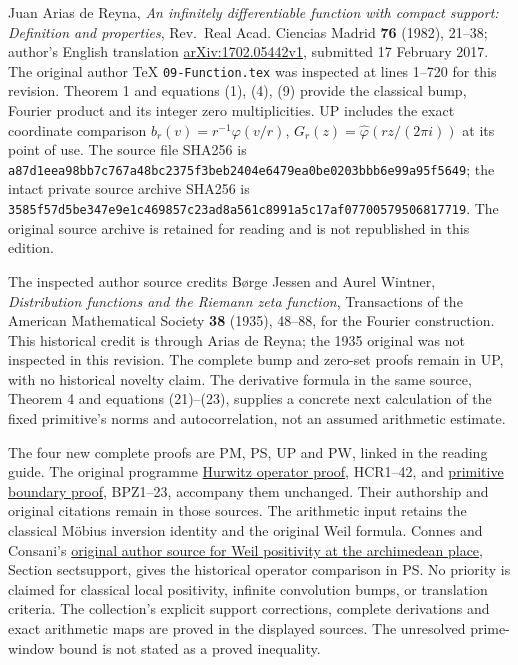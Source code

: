 \documentclass[
  10pt,
  a4paper,
]{article}
\begin{document}
Juan Arias de Reyna, \emph{An infinitely differentiable function with
compact support: Definition and properties}, Rev.~Real Acad. Ciencias
Madrid \textbf{76} (1982), 21--38; author's English translation
\href{https://arxiv.org/abs/1702.05442v1}{arXiv:1702.05442v1}, submitted
17 February 2017. The original author TeX \texttt{09-\allowbreak{}Function.\allowbreak{}tex} was
inspected at lines 1--720 for this revision. Theorem 1 and equations
(1), (4), (9) provide the classical bump, Fourier product and its
integer zero multiplicities. UP includes the exact coordinate comparison
\(b_r(v)=r^{-1}\varphi(v/r)\), \(G_r(z)=\widehat\varphi(rz/(2\pi i))\)
at its point of use. The source file SHA256 is
\texttt{a87d1eea\allowbreak{}98bb7c76\allowbreak{}7a48bc23\allowbreak{}75f3beb2\allowbreak{}404e6479\allowbreak{}ea0be020\allowbreak{}3bbb6e99\allowbreak{}a95f5649};
the intact private source archive SHA256 is
\texttt{3585f57d\allowbreak{}5be347e9\allowbreak{}e1c46985\allowbreak{}7c23ad8a\allowbreak{}561c8991\allowbreak{}a5c17af0\allowbreak{}77005795\allowbreak{}06817719}.
The original source archive is retained for reading and is not
republished in this edition.

The inspected author source credits Børge Jessen and Aurel Wintner,
\emph{Distribution functions and the Riemann zeta function},
Transactions of the American Mathematical Society \textbf{38} (1935),
48--88, for the Fourier construction. This historical credit is through
Arias de Reyna; the 1935 original was not inspected in this revision.
The complete bump and zero-set proofs remain in UP, with no historical
novelty claim. The derivative formula in the same source, Theorem 4 and
equations (21)--(23), supplies a concrete next calculation of the fixed
primitive's norms and autocorrelation, not an assumed arithmetic
estimate.

The four new complete proofs are PM, PS, UP and PW, linked in the
reading guide. The original programme
\href{HURWITZ_CYCLOTOMIC_RECEIVER.tex}{Hurwitz operator proof},
HCR1--42, and \href{BOUNDARY_PRIMITIVE_ALL_ZERO_RECEIVER.tex}{primitive
boundary proof}, BPZ1--23, accompany them unchanged. Their authorship
and original citations remain in those sources. The arithmetic input
retains the classical Möbius inversion identity and the original Weil
formula. Connes and Consani's
\href{https://arxiv.org/src/2006.13771v1}{original author source for
Weil positivity at the archimedean place}, Section sectsupport, gives
the historical operator comparison in PS. No priority is claimed for
classical local positivity, infinite convolution bumps, or translation
criteria. The collection's explicit support corrections, complete
derivations and exact arithmetic maps are proved in the displayed
sources. The unresolved prime-window bound is not stated as a proved
inequality.
\end{document}
